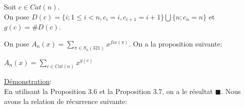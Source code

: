 				 \begin{definition}
				 	\begin{rm}
				 		Soit $c \in Cat(n) $.\\
				 		On pose $D(c)=\{i; 1\leq i < n , c_{i}=i,c_{i+1}=i+1 \} \bigcup \{n; c_{n}=n\}$ et $g(c) = \#D(c)$.
				 	\end{rm}
				 \end{definition}
				On pose $A_{n}(x)= \underset{\pi \in S_{n}(321)}{\sum}x^{fix(\pi)}$. On a la proposition suivante:

				\begin{proposition}
					$A_{n}(x)= \underset{c \in Cat(n)}{\sum}x^{g(c)}$
				\end{proposition}
				\underline{Démonstration}:\\
				En utilisant la Proposition 3.6 et la Proposition 3.7, on a le résultat $\blacksquare$. Nous avons la relation de récurrence suivante:
				\begin{proposition}
					
				\end{proposition}